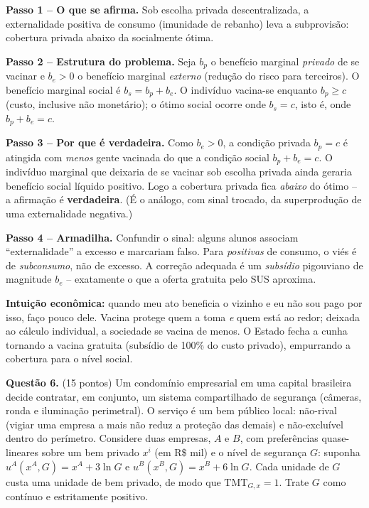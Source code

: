 \begin{solucao}
\textbf{Passo 1 -- O que se afirma.} Sob escolha privada descentralizada, a externalidade positiva de consumo (imunidade de rebanho) leva a subprovis\~ao: cobertura privada abaixo da socialmente \'otima.

\textbf{Passo 2 -- Estrutura do problema.} Seja $b_p$ o benef\'icio marginal \emph{privado} de se vacinar e $b_e > 0$ o benef\'icio marginal \emph{externo} (redu\c{c}\~ao do risco para terceiros). O benef\'icio marginal social \'e $b_s = b_p + b_e$. O indiv\'iduo vacina-se enquanto $b_p \ge c$ (custo, inclusive n\~ao monet\'ario); o \'otimo social ocorre onde $b_s = c$, isto \'e, onde $b_p + b_e = c$.

\textbf{Passo 3 -- Por que \'e verdadeira.} Como $b_e>0$, a condi\c{c}\~ao privada $b_p=c$ \'e atingida com \emph{menos} gente vacinada do que a condi\c{c}\~ao social $b_p + b_e = c$. O indiv\'iduo marginal que deixaria de se vacinar sob escolha privada ainda geraria benef\'icio social l\'iquido positivo. Logo a cobertura privada fica \emph{abaixo} do \'otimo -- a afirma\c{c}\~ao \'e \textbf{verdadeira}. (\'E o an\'alogo, com sinal trocado, da superprodu\c{c}\~ao de uma externalidade negativa.)

\textbf{Passo 4 -- Armadilha.} Confundir o sinal: alguns alunos associam ``externalidade'' a excesso e marcariam falso. Para \emph{positivas} de consumo, o vi\'es \'e de \emph{subconsumo}, n\~ao de excesso. A corre\c{c}\~ao adequada \'e um \emph{subs\'idio} pigouviano de magnitude $b_e$ -- exatamente o que a oferta gratuita pelo SUS aproxima.

\textbf{Intui\c{c}\~ao econ\^omica:} quando meu ato beneficia o vizinho e eu n\~ao sou pago por isso, fa\c{c}o pouco dele. Vacina protege quem a toma \emph{e} quem est\'a ao redor; deixada ao c\'alculo individual, a sociedade se vacina de menos. O Estado fecha a cunha tornando a vacina gratuita (subs\'idio de 100\% do custo privado), empurrando a cobertura para o n\'ivel social.
\end{solucao}


\textbf{Questão 6.} (15 pontos) Um condom\'inio empresarial em uma capital brasileira decide contratar, em conjunto, um sistema compartilhado de seguran\c{c}a (c\^ameras, ronda e ilumina\c{c}\~ao perimetral). O servi\c{c}o \'e um bem p\'ublico local: n\~ao-rival (vigiar uma empresa a mais n\~ao reduz a prote\c{c}\~ao das demais) e n\~ao-exclu\'ivel dentro do per\'imetro. Considere duas empresas, $A$ e $B$, com prefer\^encias quase-lineares sobre um bem privado $x^i$ (em R\$ mil) e o n\'ivel de seguran\c{c}a $G$: suponha $u^A(x^A, G) = x^A + 3\ln G$ e $u^B(x^B, G) = x^B + 6\ln G$. Cada unidade de $G$ custa uma unidade de bem privado, de modo que $\text{TMT}_{G,x} = 1$. Trate $G$ como cont\'inuo e estritamente positivo.

